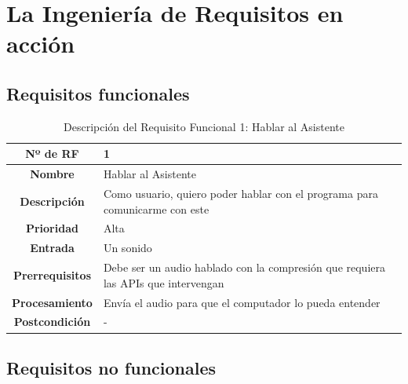 
\section{La Ingeniería de Requisitos en acción}

\subsection{Requisitos funcionales}

\begin{table}[H]
	\centering
	\begin{tabularx}{\textwidth}{|c|X|} 
		\hline
		\textbf{Nº de RF }          &  1 \\ 
		\hline
		\textbf{Nombre}         &  Hablar al Asistente \\ 
		\hline
		\textbf{Descripción}    &  Como usuario, quiero poder hablar con el programa para comunicarme con este \\ 
		\hline
		\textbf{Prioridad}      &  Alta  \\ 
		\hline
		\textbf{Entrada}        & Un sonido  \\ 
		\hline
		\textbf{Prerrequisitos} & Debe ser un audio hablado con la compresión que requiera las APIs que intervengan  \\ 
		\hline
		\textbf{Procesamiento}  &  Envía el audio para que el computador lo pueda entender \\ 
		\hline
		\textbf{Postcondición}  &  - \\
		\hline
	\end{tabularx}
	\caption{Descripción del Requisito Funcional 1: Hablar al Asistente}
\end{table}
\subsection{Requisitos no funcionales} 